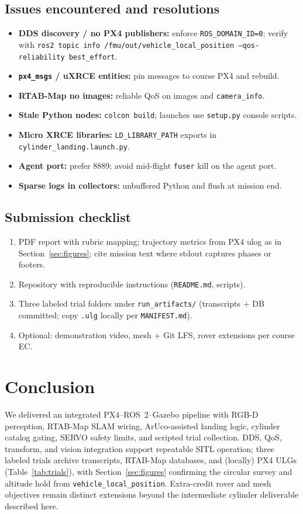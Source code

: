 \documentclass[11pt]{article}
\begin{document}
\subsection{Issues encountered and resolutions}
\begin{itemize}[itemsep=2pt]
    \item \textbf{DDS discovery / no PX4 publishers:} enforce \texttt{ROS\_DOMAIN\_ID=0}; verify with \texttt{ros2 topic info /fmu/out/vehicle\_local\_position --qos-reliability best\_effort}.
    \item \textbf{\texttt{px4\_msgs} / uXRCE entities:} pin messages to course PX4 and rebuild.
    \item \textbf{RTAB-Map no images:} reliable QoS on images and \texttt{camera\_info}.
    \item \textbf{Stale Python nodes:} \texttt{colcon build}; launches use \texttt{setup.py} console scripts.
    \item \textbf{Micro XRCE libraries:} \texttt{LD\_LIBRARY\_PATH} exports in \texttt{cylinder\_landing.launch.py}.
    \item \textbf{Agent port:} prefer 8889; avoid mid-flight \texttt{fuser} kill on the agent port.
    \item \textbf{Sparse logs in collectors:} unbuffered Python and flush at mission end.
\end{itemize}

\subsection{Submission checklist}
\begin{enumerate}[itemsep=2pt]
    \item PDF report with rubric mapping; trajectory metrics from PX4 ulog as in Section~\ref{sec:figures}; cite mission text where stdout captures phases or footers.
    \item Repository with reproducible instructions (\texttt{README.md}, scripts).
    \item Three labeled trial folders under \texttt{run\_artifacts/} (transcripts + DB committed; copy \texttt{.ulg} locally per \texttt{MANIFEST.md}).
    \item Optional: demonstration video, mesh + Git LFS, rover extensions per course EC.
\end{enumerate}

\newpage
\section{Conclusion}
We delivered an integrated PX4--ROS~2--Gazebo pipeline with RGB-D perception, RTAB-Map SLAM wiring, ArUco-assisted landing logic, cylinder catalog gating, SERVO safety limits, and scripted trial collection. DDS, QoS, transform, and vision integration support repeatable SITL operation; three labeled trials archive transcripts, RTAB-Map databases, and (locally) PX4 ULGs (Table~\ref{tab:trials}), with Section~\ref{sec:figures} confirming the circular survey and altitude hold from \texttt{vehicle\_local\_position}. Extra-credit rover and mesh objectives remain distinct extensions beyond the intermediate cylinder deliverable described here.
\end{document}
